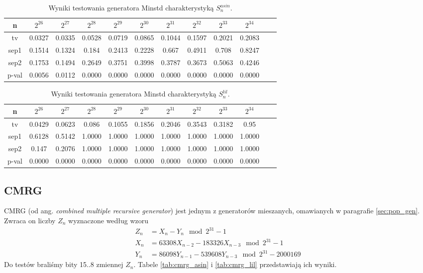 \documentclass[a4paper,11pt,twoside]{book}
\newcommand{\Slil}[1]{S^{lil}_#1}
\newcommand{\Sasin}[1]{S^{asin}_#1}
\theoremstyle{definition}
\begin{document}
\begin{table}[ht!]
\centering
 \caption{Wyniki testowania generatora Minstd charakterystyką $\Sasin{n}$.}
 \label{tab:minstd_asin}
\begin{tabular} {||c|c|c|c|c|c|c|c|c|c|c|c||}  
 \hline
     n &  $2^{26}$ &  $2^{27}$ &  $2^{28}$ &  $2^{29}$ &  $2^{30}$ &  $2^{31}$ &  $2^{32}$ &  $2^{33}$ &  $2^{34}$\\ \hline
     tv &  0.0327 &  0.0335 &  0.0528 &  0.0719 &  0.0865 &  0.1044 &  0.1597 &  0.2021 &  0.2083\\ \hline
   sep1 &  0.1514 &  0.1324 &   0.184 &  0.2413 &  0.2228 &   0.667 &  0.4911 &   0.708 &  0.8247\\ \hline
   sep2 &  0.1753 &  0.1494 &  0.2649 &  0.3751 &  0.3998 &  0.3787 &  0.3673 &  0.5063 &  0.4246\\ \hline
  p-val &  0.0056 &  0.0112 &  0.0000 &  0.0000 &  0.0000 &  0.0000 &  0.0000 &  0.0000 &  0.0000\\ \hline
\end{tabular}  
\end{table}
\begin{table}[ht!]
\centering
 \caption{Wyniki testowania generatora Minstd charakterystyką $\Slil{n}$.}
 \label{tab:minstd_lil}
\begin{tabular} {||c|c|c|c|c|c|c|c|c|c|c|c||}  
 \hline 
     n &  $2^{26}$ &  $2^{27}$ &  $2^{28}$ &  $2^{29}$ &  $2^{30}$ &  $2^{31}$ &  $2^{32}$ &  $2^{33}$ &  $2^{34}$\\ \hline
     tv &  0.0429 &  0.0623 &   0.086 &  0.1055 &  0.1856 &  0.2046 &  0.3543 &  0.3182 &    0.95\\ \hline
   sep1 &  0.6128 &  0.5142 &  1.0000 &  1.0000 &  1.0000 &  1.0000 &  1.0000 &  1.0000 &  1.0000\\ \hline
   sep2 &   0.147 &  0.2076 &  1.0000 &  1.0000 &  1.0000 &  1.0000 &  1.0000 &  1.0000 &  1.0000\\ \hline
  p-val &  0.0000 &  0.0000 &  0.0000 &  0.0000 &  0.0000 &  0.0000 &  0.0000 &  0.0000 &  0.0000\\ \hline
\end{tabular}  
\end{table}



\FloatBarrier
\subsection{CMRG}
CMRG (od ang. \textit{combined multiple recursive generator}) jest jednym z generatorów mieszanych, omawianych w paragrafie \ref{sec:pop_gen}. Zwraca on liczby $Z_n$ wyznaczone według wzoru
\begin{equation}
 \begin{split}
    Z_n &= X_n - Y_n \mod 2^{31}-1 \\
    X_n &= 63308 X_{n-2} - 183326 X_{n-3} \mod 2^{31}-1 \\
    Y_n &= 86098 Y_{n-1} - 539608 Y_{n-3} \mod 2^{31} - 2000169
 \end{split}
\end{equation}
Do testów braliśmy bity 15..8 zmiennej $Z_n$. Tabele \ref{tab:cmrg_asin} i \ref{tab:cmrg_lil} przedstawiają ich wyniki.
\end{document}

